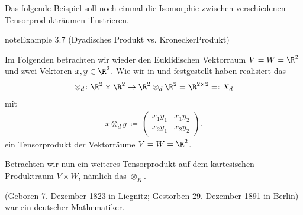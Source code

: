\documentclass[letterpaper,10pt,german]{jupyterBook}
\begin{document}
\sphinxAtStartPar
Das folgende Beispiel soll noch einmal die Isomorphie zwischen verschiedenen Tensorprodukträumen illustrieren.
\label{vektoranalysis/tensor:example-9}
\begin{sphinxadmonition}{note}{Example 3.7 (Dyadisches Produkt vs. Kronecker\sphinxhyphen{}Produkt)}



\sphinxAtStartPar
Im Folgenden betrachten wir wieder den Euklidischen Vektorraum \(V=W=\R^2\) und zwei Vektoren \(x, y \in \R^2\).
Wie wir in {\hyperref[\detokenize{vektoranalysis/tensor:ex:tensorproduktVarianten}]{}} und {\hyperref[\detokenize{vektoranalysis/tensor:ex:universelleEigenschaft}]{}} festgestellt haben realisiert das 
\begin{equation*}
\begin{split}\otimes_d \colon \R^2 \times \R^2 \rightarrow \R^2 \otimes_d \R^2 = \R^{2 \times 2} =: X_d\end{split}
\end{equation*}
\sphinxAtStartPar
mit
\begin{equation*}
\begin{split}x \otimes_d y \, \coloneqq \,
\begin{pmatrix}
x_1y_1 & x_1y_2 \\
x_2y_1 & x_2y_2
\end{pmatrix}.\end{split}
\end{equation*}
\sphinxAtStartPar
ein Tensorprodukt der Vektorräume \(V=W=\R^2\).

\sphinxAtStartPar
Betrachten wir nun ein weiteres Tensorprodukt auf dem kartesischen Produktraum \(V \times W\), nämlich das  \(\otimes_K\).

\begin{sphinxShadowBox}

\sphinxAtStartPar
{} (Geboren 7. Dezember 1823 in Liegnitz; Gestorben 29. Dezember 1891 in Berlin) war ein deutscher Mathematiker.
\end{sphinxShadowBox}


\end{sphinxadmonition}
\end{document}
